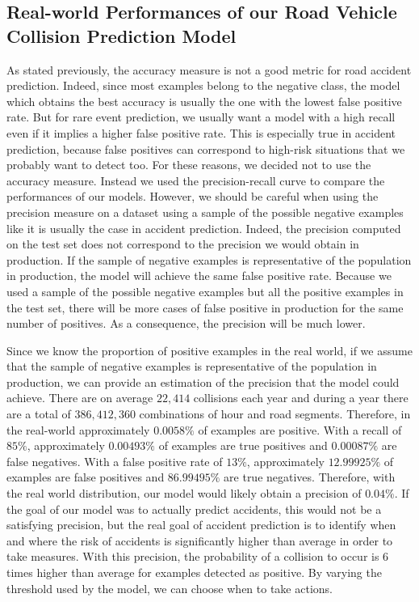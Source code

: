 \documentclass[conference]{IEEEtran}
\begin{document}
\subsection{Real-world Performances of our Road Vehicle Collision Prediction Model}
As stated previously, the accuracy measure is not a good metric for road accident
prediction. Indeed, since most examples belong to the negative class, the model which obtains
the best accuracy is usually the one with the lowest false positive rate. But for rare event
prediction, we usually want a model with a high recall even if it implies a higher false
positive rate. This is especially true in accident prediction, because false positives can correspond to high-risk situations that we probably want to detect too. For these reasons, we decided not to use the accuracy measure. Instead
we used the precision-recall curve to compare the performances of our models. However, we
should be careful when using the precision measure on a dataset using a sample of the possible
negative examples like it is usually the case in accident prediction. Indeed, the precision
computed on the test set does not correspond to the precision we would obtain in production.
If the sample of negative examples is representative of the population
in production, the model will achieve the same false positive rate.
Because we used a sample of the possible negative examples but all the
positive examples in the test set, there will be more cases of false positive in production for the same number of positives. As a consequence, the precision will be much lower.

Since we know the proportion of positive examples in the real world, if we assume that the
sample of negative examples is representative of the population in production, we can provide
an estimation of the precision that the model could achieve. There are on average $22,414$ collisions each year and during a year there are a total of $386,412,360$ combinations of hour and road segments. Therefore, in the real-world approximately $0.0058\%$ of examples are positive. With a recall of $85\%$, approximately $0.00493\%$ of examples are true positives and $0.00087\%$ are false negatives. With a false positive rate of $13\%$, approximately $12.99925\%$ of examples are false positives and $86.99495\%$ are true negatives. Therefore, with the real world distribution, our model would likely obtain a precision of
$0.04\%$. If the goal of our model was to actually predict accidents, this would not be a satisfying precision, but the real goal of accident prediction is to identify when and where the risk of accidents is significantly higher than average in order to take measures. With this precision, the probability of a collision to occur is 6 times higher than average for examples detected as positive. By varying the threshold used by the model, we can choose when to take actions.
\end{document}
